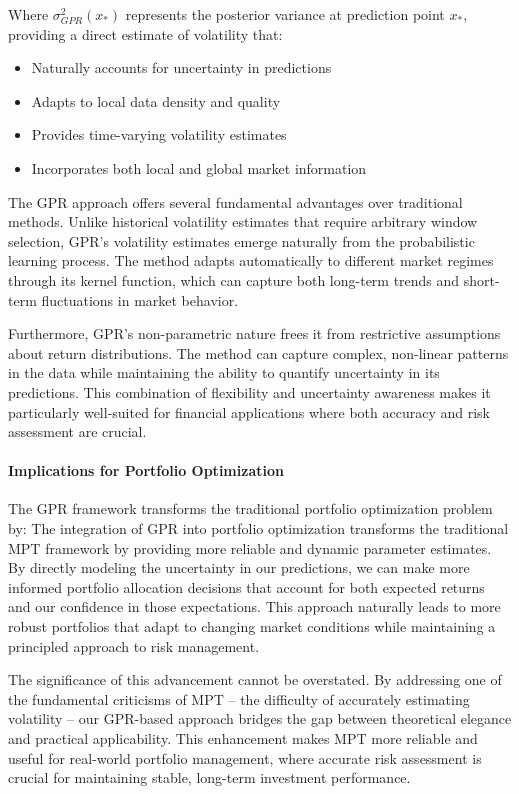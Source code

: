 Where $\sigma_{GPR}^2(x_*)$ represents the posterior variance at prediction point $x_*$, providing a direct estimate of volatility that:

\begin{itemize}
    \item Naturally accounts for uncertainty in predictions
    \item Adapts to local data density and quality
    \item Provides time-varying volatility estimates
    \item Incorporates both local and global market information
\end{itemize}

The \ac{GPR} approach offers several fundamental advantages over traditional methods. Unlike historical volatility estimates that require arbitrary window selection, \ac{GPR}'s volatility estimates emerge naturally from the probabilistic learning process. The method adapts automatically to different market regimes through its kernel function, which can capture both long-term trends and short-term fluctuations in market behavior.

Furthermore, \ac{GPR}'s non-parametric nature frees it from restrictive assumptions about return distributions. The method can capture complex, non-linear patterns in the data while maintaining the ability to quantify uncertainty in its predictions. This combination of flexibility and uncertainty awareness makes it particularly well-suited for financial applications where both accuracy and risk assessment are crucial.


\paragraph{Implications for Portfolio Optimization}
The \ac{GPR} framework transforms the traditional portfolio optimization problem by:
The integration of \ac{GPR} into portfolio optimization transforms the traditional \ac{MPT} framework by providing more reliable and dynamic parameter estimates. By directly modeling the uncertainty in our predictions, we can make more informed portfolio allocation decisions that account for both expected returns and our confidence in those expectations. This approach naturally leads to more robust portfolios that adapt to changing market conditions while maintaining a principled approach to risk management.

The significance of this advancement cannot be overstated. By addressing one of the fundamental criticisms of \ac{MPT} – the difficulty of accurately estimating volatility – our \ac{GPR}-based approach bridges the gap between theoretical elegance and practical applicability. This enhancement makes \ac{MPT} more reliable and useful for real-world portfolio management, where accurate risk assessment is crucial for maintaining stable, long-term investment performance.


